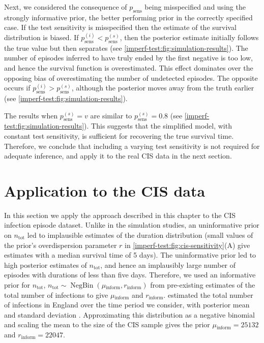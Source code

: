 \documentclass[referee,useAMS,usenatbib]{biom}
\DeclareMathOperator{\NBr}{NegBin}
\newcommand{\NBc}{\NBr}
\newcommand\citePersonalComms[1]{(#1, personal communication)}
\newcommand{\psens}{p_\text{sens}}
\newcommand{\psenss}{p_\text{sens}^{(s)}}
\newcommand{\psensi}{p_\text{sens}^{(i)}}
\newcommand{\ntot}{n_\text{tot}}
\newcommand{\inform}{{_{\text{inform}}}}
\begin{document}
Next, we considered the consequence of $\psens$ being misspecified and using the strongly informative prior, the better performing prior in the correctly specified case.
If the test sensitivity is misspecified then the estimate of the survival distribution is biased.
If $\psensi < \psenss$, then the posterior estimate initially follows the true value but then separates (see \cref{imperf-test:fig:simulation-results}).
The number of episodes inferred to have truly ended by the first negative is too low, and hence the survival function is overestimated.
This effect dominates over the opposing bias of overestimating the number of undetected episodes.
The opposite occurs if $\psensi > \psenss$, although the posterior moves away from the truth earlier (see \cref{imperf-test:fig:simulation-results}).

The results when $\psenss = v$ are similar to $\psenss = 0.8$ (see \cref{imperf-test:fig:simulation-results}).
This suggests that the simplified model, with constant test sensitivity, is sufficient for recovering the true survival time.
Therefore, we conclude that including a varying test sensitivity is not required for adequate inference, and apply it to the real CIS data in the next section.

\section{Application to the CIS data} \label{sec:CIS}

In this section we apply the approach described in this chapter to the CIS infection episode dataset.
Unlike in the simulation studies, an uninformative prior on $\ntot$ led to implausible estimates of the duration distribution (small values of the prior's overdispersion parameter $r$ in \cref{imperf-test:fig:cis-sensitivity}(A) give estimates with a median survival time of 5 days).
The uninformative prior led to high posterior estimates of $\ntot$, and hence an implausibly large number of episodes with durations of less than five days.
Therefore, we used an informative prior for $\ntot$, $\ntot \sim \NBc(\mu\inform, r\inform)$ from pre-existing estimates of the total number of infections to give $\mu\inform$ and $r\inform$.
\citet{birrellRTM2} estimated the total number of infections in England over the time period we consider, with posterior mean  and standard deviation .
Approximating this distribution as a negative binomial and scaling the mean to the size of the CIS sample gives the prior $\mu\inform = 25132$ and $r\inform = 22047$.
\end{document}
